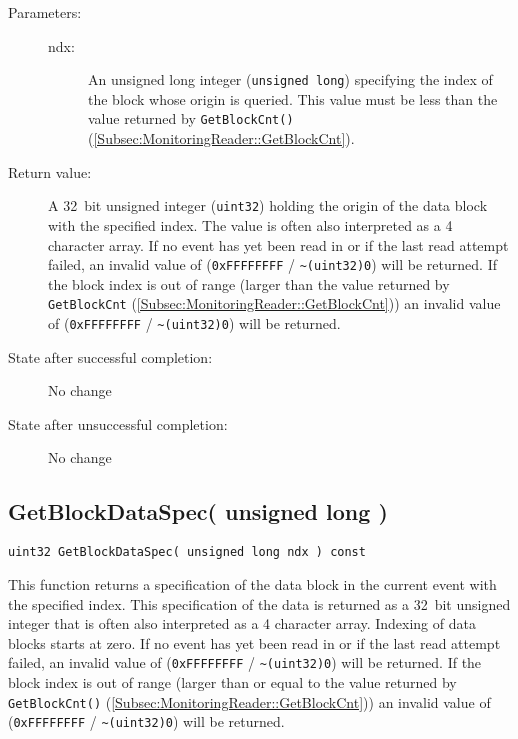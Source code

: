 \documentclass[a4paper,twoside]{article}
\begin{document}
\begin{description}
\item[Parameters:]
	\begin{description}
		\item[ndx:] An unsigned long integer (\texttt{unsigned long}) specifying the index of the block whose origin is queried.
		This value must be less than the value returned by \texttt{GetBlockCnt()} (\ref{Subsec:MonitoringReader::GetBlockCnt}).
	\end{description}
\item[Return value:] A 32~bit unsigned integer (\texttt{uint32}) holding the origin of the data block with the specified index. The value is often also interpreted as a 4
character array.
If no event has yet been read in or if the last read attempt failed, an invalid value of (\texttt{0xFF\-FF\-FF\-FF} / \texttt{\~{ }(uint32)0}) 
will be returned.
If the block index is out of range (larger than the value returned by \texttt{GetBlockCnt} (\ref{Subsec:MonitoringReader::GetBlockCnt}))
an invalid value of (\texttt{0xFF\-FF\-FF\-FF} / \texttt{\~{ }(uint32)0}) will be returned.
\item[State after successful completion:] No change
\item[State after unsuccessful completion:] No change
\end{description}


\subsection{GetBlockDataSpec( unsigned long )}

\texttt{uint32 GetBlockDataSpec( unsigned long ndx ) const}

This function returns a specification of the data block in the current event with the specified index. This specification of the data is returned as a 32~bit unsigned integer
that is often also interpreted as a 4 character array. 
Indexing of data blocks starts at zero.
If no event has yet been read in or if the last read attempt failed, an invalid value of (\texttt{0xFF\-FF\-FF\-FF} / \texttt{\~{ }(uint32)0}) 
will be returned.
If the block index is out of range (larger than or equal to the value returned by \texttt{GetBlockCnt()} (\ref{Subsec:MonitoringReader::GetBlockCnt})) an 
invalid value of (\texttt{0xFF\-FF\-FF\-FF} / \texttt{\~{ }(uint32)0}) will be returned.
\end{document}
